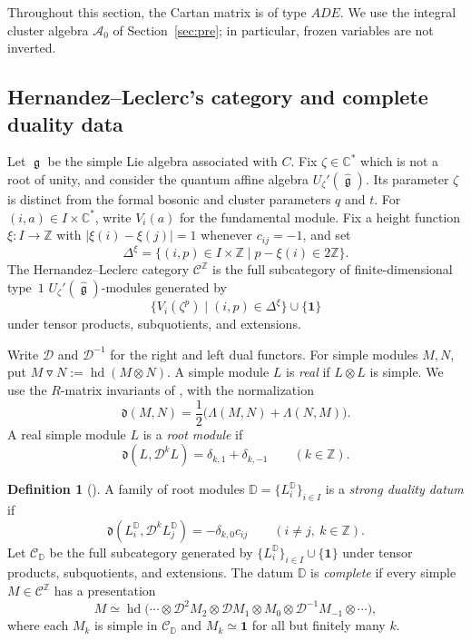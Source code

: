 \documentclass[12pt, reqno]{amsart}
\theoremstyle{plain}
\theoremstyle{definition}
\newtheorem{definition}[theorem]{Definition}
\numberwithin{equation}{section}
\newcommand{\ZZ}{\mathbb{Z}}
\newcommand{\CC}{\mathbb{C}}
\newcommand{\DD}{\mathbb{D}}
\newcommand{\fg}{\operatorname{\mathfrak{g}}}
\newcommand{\cA}{\mathcal{A}}
\begin{document}
Throughout this section, the Cartan matrix is of type \(ADE\).
We use the integral cluster algebra \(\cA_0\) of
Section~\ref{sec:pre}; in particular, frozen variables are not inverted.

\subsection{Hernandez--Leclerc's category and complete duality data}

Let \(\fg\) be the simple Lie algebra associated with \(C\). Fix
\(\zeta\in\CC^*\) which is not a root of unity, and consider the
quantum affine algebra \(U_{\zeta}'(\widehat{\fg})\).
Its parameter \(\zeta\) is distinct from the formal bosonic and cluster
parameters \(q\) and \(t\). For \((i,a)\in I\times\CC^*\), write
\(V_i(a)\) for the fundamental module. Fix a height function
\(\xi:I\to\ZZ\) with \(|\xi(i)-\xi(j)|=1\) whenever \(c_{ij}=-1\),
and set
\[
\Delta^\xi=\{(i,p)\in I\times\ZZ\mid p-\xi(i)\in2\ZZ\}.
\]
The Hernandez--Leclerc category \(\mathscr C^{\ZZ}\) is the full
subcategory of finite-dimensional type~\(1\)
\(U_{\zeta}'(\widehat{\fg})\)-modules generated by
\[
\{V_i(\zeta^p)\mid(i,p)\in\Delta^\xi\}\cup\{\mathbf1\}
\]
under tensor products, subquotients, and extensions.

Write \(\mathcal D\) and \(\mathcal D^{-1}\) for the right and left
dual functors. For simple modules \(M,N\), put
\(M\triangledown N:=\operatorname{hd}(M\otimes N)\).
A simple module \(L\) is \emph{real} if \(L\otimes L\) is simple.
We use the \(R\)-matrix invariants of
\cite[Section~1.3]{kashiwara2025monoidal}, with the normalization
\[
\mathfrak d(M,N)=\frac12\bigl(\Lambda(M,N)+\Lambda(N,M)\bigr).
\]
A real simple module \(L\) is a \emph{root module} if
\[
\mathfrak d(L,\mathcal D^kL)=\delta_{k,1}+\delta_{k,-1}
\qquad(k\in\ZZ).
\]

\begin{definition}[{\cite[Definitions~2.6 and~2.10]{kashiwara2025monoidal}}]
\label{def:complete-duality-datum}
A family of root modules \(\DD=\{L_i^{\DD}\}_{i\in I}\) is a
\emph{strong duality datum} if
\[
\mathfrak d(L_i^{\DD},\mathcal D^kL_j^{\DD})
=-\delta_{k,0}c_{ij}
\qquad(i\ne j,\ k\in\ZZ).
\]
Let \(\mathscr C_{\DD}\) be the full subcategory generated by
\(\{L_i^{\DD}\}_{i\in I}\cup\{\mathbf1\}\) under tensor products,
subquotients, and extensions. The datum \(\DD\) is \emph{complete} if
every simple \(M\in\mathscr C^{\ZZ}\) has a presentation
\[
M\simeq\operatorname{hd}\bigl(
\cdots\otimes\mathcal D^2M_2\otimes\mathcal DM_1
\otimes M_0\otimes\mathcal D^{-1}M_{-1}\otimes\cdots\bigr),
\]
where each \(M_k\) is simple in \(\mathscr C_{\DD}\) and
\(M_k\simeq\mathbf1\) for all but finitely many \(k\).
\end{definition}
\end{document}
